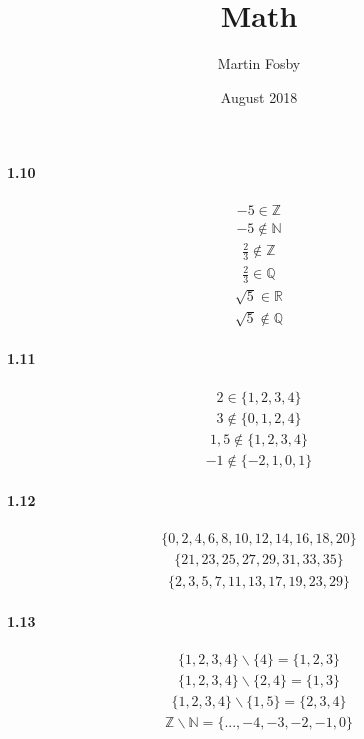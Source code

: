 \documentclass{article}
\title{Math}
\author{Martin Fosby }
\date{August 2018}
\newcommand{\Z}{\mathbb{Z}}
\newcommand{\N}{\mathbb{N}}
\newcommand{\Q}{\mathbb{Q}}
\newcommand{\R}{\mathbb{R}}
\begin{document}

\paragraph{1.10}
\label{1.10}
\begin{align*}
   -5 \in \Z 
\end{align*}
\begin{align*}
   -5 \notin \N 
\end{align*}
\begin{align*}
   \frac{2}{3} \notin \Z
\end{align*}
\begin{align*}
  \frac{2}{3} \in \Q
\end{align*}
\begin{align*}
  \sqrt{5} \in \R
\end{align*}
\begin{align*}
  \sqrt{5} \notin \Q
\end{align*}

\paragraph{1.11}
\begin{align*}
  2 \in \{1,2,3,4\}
\end{align*}
\begin{align*}
  3 \notin \{0,1,2,4\}
\end{align*}
\begin{align*}
  1,5 \notin \{1,2,3,4\}
\end{align*}
\begin{align*}
  -1 \notin \{-2,1,0,1\}
\end{align*}

\paragraph{1.12}
\begin{align*}
  \{0,2,4,6,8,10,12,14,16,18,20\}
\end{align*}
\begin{align*}
  \{21,23,25,27,29,31,33,35\}
\end{align*}
\begin{align*}
  \{2,3,5,7,11,13,17,19,23,29\}
\end{align*}

\paragraph{1.13}
\begin{align*}
  \{1,2,3,4\} \backslash \{4\} = \{1,2,3\}
\end{align*}
\begin{align*}
  \{1,2,3,4\} \backslash \{2,4\} = \{1,3\}
\end{align*}
\begin{align*}
  \{1,2,3,4\} \backslash \{1,5\} = \{2,3,4\}
\end{align*}
\begin{align*}
  \Z \backslash \N = \{..., -4, -3, -2, -1, 0\}
\end{align*}
\end{document}
